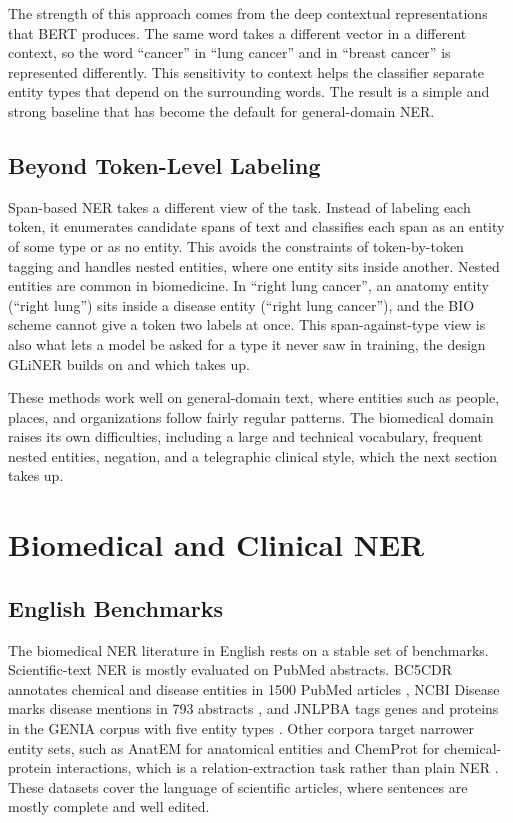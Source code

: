 The strength of this approach comes from the deep contextual representations that BERT
produces. The same word takes a different vector in a different context, so the word
``cancer'' in ``lung cancer'' and in ``breast cancer'' is represented differently. This
sensitivity to context helps the classifier separate entity types that depend on the
surrounding words. The result is a simple and strong baseline that has become the default for
general-domain NER.

\subsection{Beyond Token-Level Labeling}

Span-based NER takes a different view of the task. Instead of labeling each token, it
enumerates candidate spans of text and classifies each span as an entity of some type or as no
entity. This avoids the constraints of token-by-token tagging and handles nested entities,
where one entity sits inside another. Nested entities are common in biomedicine. In ``right
lung cancer'', an anatomy entity (``right lung'') sits inside a disease entity (``right lung
cancer''), and the BIO scheme cannot give a token two labels at once. This span-against-type
view is also what lets a model be asked for a type it never saw in training, the design GLiNER
builds on \citep{zaratiana2024gliner} and which  takes up.

These methods work well on general-domain text, where entities such as people, places, and
organizations follow fairly regular patterns. The biomedical domain raises its own
difficulties, including a large and technical vocabulary, frequent nested entities, negation,
and a telegraphic clinical style, which the next section takes up.
\section{Biomedical and Clinical NER}
\label{sec:ie-biomed-ner}

\subsection{English Benchmarks}

The biomedical NER literature in English rests on a stable set of benchmarks. Scientific-text
NER is mostly evaluated on PubMed abstracts. BC5CDR annotates chemical and disease entities in
1500 PubMed articles \citep{li2016bc5cdr}, NCBI Disease marks disease mentions in 793 abstracts
\citep{dogan2014ncbi}, and JNLPBA tags genes and proteins in the GENIA corpus with five entity
types \citep{collier2004jnlpba}. Other corpora target narrower entity sets, such as AnatEM for
anatomical entities \citep{pyysalo2014anatem} and ChemProt for chemical-protein interactions,
which is a relation-extraction task rather than plain NER \citep{krallinger2017chemprot}. These
datasets cover the language of scientific articles, where sentences are mostly complete and
well edited.

